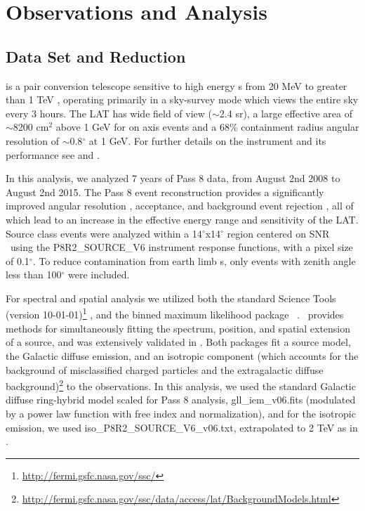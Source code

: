 \section{\label{sec:LATobs}\FermiLat  Observations and  Analysis }
\subsection{\label{sec:LATdata}Data Set and Reduction}
\FermiLat is a pair conversion telescope sensitive to high energy \gam s  from 20 MeV to greater than 1 TeV \citep{2FHL}, operating primarily in a sky-survey mode which views  the entire sky every 3 hours. The LAT has wide field of view ($\sim$2.4 sr), a large effective area of $\sim$8200 cm$^2$ above 1 GeV for on axis events and a  68\% containment radius angular resolution  of $\sim$0.8$^\circ$  at 1 GeV. For further details  on the instrument and its performance see \cite{atwood09} and \cite{lat_perf}.

In this analysis, we  analyzed 7 years of Pass 8 data, from August 2nd 2008  to August 2nd 2015. The Pass 8 event reconstruction provides a significantly improved angular resolution , acceptance, and background event rejection \citep{atwood13b,atwood13}, all of which lead to an increase in the effective energy range and sensitivity of the LAT. Source class events were analyzed within a 14$^\circ$x14$^\circ$ region centered on SNR \Gone~using the P8R2\_SOURCE\_V6 instrument response functions, with a pixel size of 0.1$^{\circ}$. To reduce contamination from earth limb \gam s, only events with zenith angle less than 100$^{\circ}$ were included.

For spectral and spatial analysis we utilized both the standard \Fermi Science Tools (version 10-01-01)\footnote[1]{\url{http://fermi.gsfc.nasa.gov/ssc/}} , and the binned maximum likelihood package \ptlike~\citep{Kerr10}. \ptlike~provides methods for simultaneously fitting the spectrum, position, and spatial extension of a source, and was extensively validated in \cite{Lande12}. Both packages fit a source model, the Galactic diffuse emission, and an isotropic component (which accounts for the background of misclassified charged particles and the extragalactic diffuse \gam~ background)\footnote[2]{\url{http://fermi.gsfc.nasa.gov/ssc/data/access/lat/BackgroundModels.html}} to the observations. In this analysis, we used the standard Galactic diffuse ring-hybrid model scaled for Pass 8 analysis, gll{\_}iem{\_}v06.fits (modulated by a power law function with free index and normalization), and for the isotropic emission,  we used iso{\_}P8R2{\_}SOURCE{\_}V6{\_}v06.txt, extrapolated to 2 TeV as in \cite{2FHL}.

